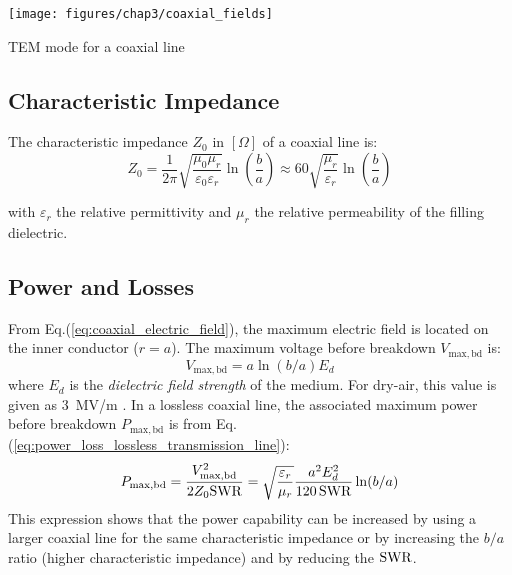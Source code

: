 \begin{marginfigure}[*-8]
	\texttt{[image: figures/chap3/coaxial\_fields]}
	\caption{TEM mode for a coaxial line}
	\label{fig:coaxial_line_fields}
\end{marginfigure}	

\subsection{Characteristic Impedance}
The characteristic impedance $Z_0$ in $[\si{\Omega}]$ of a coaxial line is:
\begin{equation}
Z_0 = 
	\frac{1}{2\pi} \sqrt{\frac{\mu_0 \mu_r}{\varepsilon_{0} \varepsilon_{r}}} \ln\left( \frac{b}{a} \right)
	\approx
	60 \sqrt{\frac{\mu_r}{\varepsilon_{r}}} \ln\left( \frac{b}{a} \right) 
\end{equation}

with $\varepsilon_{r}$ the relative permittivity and $\mu_r$ the relative permeability of the filling dielectric. 

\subsection{Power and Losses}
From Eq.(\ref{eq:coaxial_electric_field}), the maximum electric field is located on the inner conductor ($r=a$). The maximum voltage before breakdown $V_{\mathrm{max,bd}}$ is:
\begin{equation}
	V_{\mathrm{max,bd}} = a\ln\left(b/a\right) E_d
\end{equation}
where $E_d$ is the \textit{dielectric field strength} of the medium. For dry-air, this value is given as $3$~\si{MV/m} \cite[b§3.11]{pozar2012}. In a lossless coaxial line, the associated maximum power before breakdown $P_\mathrm{max,bd}$ is from Eq.(\ref{eq:power_loss_lossless_transmission_line}):
\begin{equation}
	P_\mathrm{max,bd} =  \frac{V^2_{\mathrm{max,bd}} }{2 Z_0 {\mathrm{SWR}}}= \sqrt{\frac{\varepsilon_{r}}{\mu_r}} \frac{a^2 E_d^2}{120\,{\mathrm{SWR}}} \ln (b/a)
\end{equation}
This expression shows that the power capability can be increased by using a larger coaxial line for the same characteristic impedance or by increasing the $b/a$ ratio (higher characteristic impedance) and by reducing the ${\mathrm{SWR}}$.


